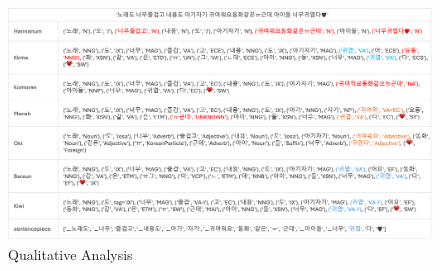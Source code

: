 \documentclass{article}
\begin{document}
\begin{figure}
        \centering
        \includegraphics[width=1\linewidth]{table.png}
        \caption{Qualitative Analysis}
        \label{fig:enter-label}
\end{figure}
\end{document}
